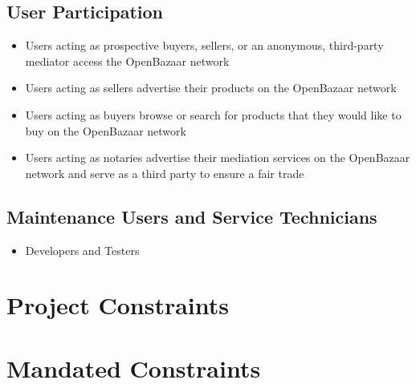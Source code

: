 \documentclass{article}
\begin{document}
\subsection{User Participation}
\begin{itemize}
\item 
Users acting as prospective buyers, sellers, or an anonymous, third-party mediator access the OpenBazaar network                
\item
Users acting as sellers advertise their products on the OpenBazaar network
\item
Users acting as buyers browse or search for products that they would like to buy on the OpenBazaar network
\item
Users acting as notaries advertise their mediation services on the OpenBazaar network and serve as a third party to ensure a fair trade
\end{itemize}
\subsection{Maintenance Users and Service Technicians}
\begin{itemize}
\item
Developers and Testers
\end{itemize}
\section*{Project Constraints}
\section{Mandated Constraints}
\end{document}
